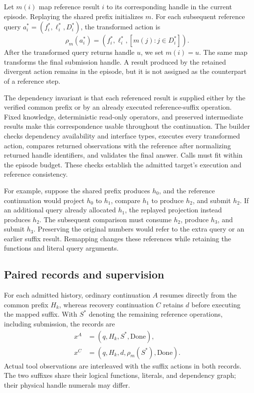 Let $m(i)$ map reference result $i$ to its corresponding handle in the current episode. Replaying the shared prefix initializes $m$. For each subsequent reference query $a_i^*=(f_i^*,\ell_i^*,D_i^*)$, the transformed action is
\begin{equation}
 \rho_m(a_i^*)=
 \left(f_i^*,\ell_i^*,[m(j):j\in D_i^*]\right).
 \label{eq:remap-en}
\end{equation}
After the transformed query returns handle $u$, we set $m(i)=u$. The same map transforms the final submission handle. A result produced by the retained divergent action remains in the episode, but it is not assigned as the counterpart of a reference step.

The dependency invariant is that each referenced result is supplied either by the verified common prefix or by an already executed reference-suffix operation. Fixed knowledge, deterministic read-only operators, and preserved intermediate results make this correspondence usable throughout the continuation. The builder checks dependency availability and interface types, executes every transformed action, compares returned observations with the reference after normalizing returned handle identifiers, and validates the final answer. Calls must fit within the episode budget. These checks establish the admitted target's execution and reference consistency.

For example, suppose the shared prefix produces $h_0$, and the reference continuation would project $h_0$ to $h_1$, compare $h_1$ to produce $h_2$, and submit $h_2$. If an additional query already allocated $h_1$, the replayed projection instead produces $h_2$. The subsequent comparison must consume $h_2$, produce $h_3$, and submit $h_3$. Preserving the original numbers would refer to the extra query or an earlier suffix result. Remapping changes these references while retaining the functions and literal query arguments.



\subsection{Paired records and supervision}

For each admitted history, ordinary continuation $A$ resumes directly from the common prefix $H_k$, whereas recovery continuation $C$ retains $d$ before executing the mapped suffix. With $S^*$ denoting the remaining reference operations, including submission, the records are
\begin{align}
 x^A &= (q,H_k,S^*,\mathrm{Done}),\\
 x^C &= (q,H_k,d,\rho_m(S^*),\mathrm{Done}).
\end{align}
Actual tool observations are interleaved with the suffix actions in both records. The two suffixes share their logical functions, literals, and dependency graph; their physical handle numerals may differ.


